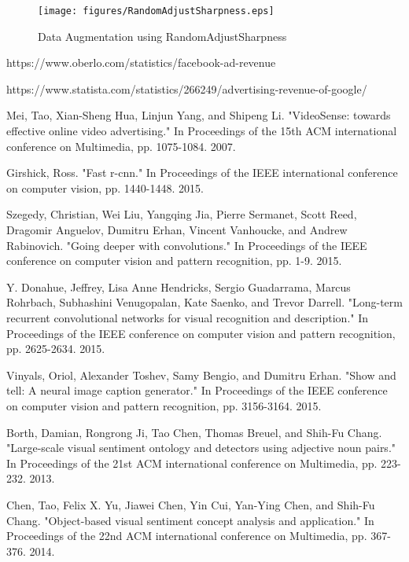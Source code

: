 \documentclass[conference]{IEEEtran}
\begin{document}
\begin{figure}[htbp] 
    \texttt{[image: figures/RandomAdjustSharpness.eps]} 
    \caption{Data Augmentation using RandomAdjustSharpness} 
    \label{fig} 
    \end{figure}    

\begin{thebibliography}{00}
 https://www.oberlo.com/statistics/facebook-ad-revenue

 https://www.statista.com/statistics/266249/advertising-revenue-of-google/

 Mei, Tao, Xian-Sheng Hua, Linjun Yang, and Shipeng Li. "VideoSense: towards effective online video advertising." In Proceedings of the 15th ACM international conference on Multimedia, pp. 1075-1084. 2007.

 Girshick, Ross. "Fast r-cnn." In Proceedings of the IEEE international conference on computer vision, pp. 1440-1448. 2015.

 Szegedy, Christian, Wei Liu, Yangqing Jia, Pierre Sermanet, Scott Reed, Dragomir Anguelov, Dumitru Erhan, Vincent Vanhoucke, and Andrew Rabinovich. "Going deeper with convolutions." In Proceedings of the IEEE conference on computer vision and pattern recognition, pp. 1-9. 2015.

 Y. Donahue, Jeffrey, Lisa Anne Hendricks, Sergio Guadarrama, Marcus Rohrbach, Subhashini Venugopalan, Kate Saenko, and Trevor Darrell. "Long-term recurrent convolutional networks for visual recognition and description." In Proceedings of the IEEE conference on computer vision and pattern recognition, pp. 2625-2634. 2015.

 Vinyals, Oriol, Alexander Toshev, Samy Bengio, and Dumitru Erhan. "Show and tell: A neural image caption generator." In Proceedings of the IEEE conference on computer vision and pattern recognition, pp. 3156-3164. 2015.

 Borth, Damian, Rongrong Ji, Tao Chen, Thomas Breuel, and Shih-Fu Chang. "Large-scale visual sentiment ontology and detectors using adjective noun pairs." In Proceedings of the 21st ACM international conference on Multimedia, pp. 223-232. 2013.

 Chen, Tao, Felix X. Yu, Jiawei Chen, Yin Cui, Yan-Ying Chen, and Shih-Fu Chang. "Object-based visual sentiment concept analysis and application." In Proceedings of the 22nd ACM international conference on Multimedia, pp. 367-376. 2014.


\end{thebibliography}
\end{document}
